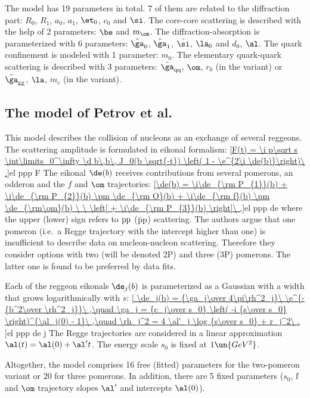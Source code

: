 The model has 19 parameters in total. 7 of them are related to the diffraction part: $R_0$, $R_1$, $a_0$, $a_1$, $\et_0$, $c_0$ and $\si$. The core-core scattering is described with the help of 2 parameters: $\be$ and $m_\om$. The diffraction-absorption is parameterized with 6 parameters: $\hat\ga_0$, $\hat\ga_1$, $\hat\si$, $\la_0$ and $d_0$, $\al$. The quark confinement is modeled with 1 parameter: $m_0$. The elementary quark-quark scattering is described with 3 parameters: $\tilde\ga_{\rm qq}$, $\om$, $r_0$ (in the  variant) or $\tilde\ga_{\rm gg}$, $\la$, $m_c$ (in the  variant).



\subsection{The model of Petrov et al.}

This model  describes the collision of nucleons as an exchange of several reggeons. The scattering amplitude is formulated in eikonal formalism:
\eqref{F(t) = \i p\sqrt s \int\limits_0^\infty \d b\,b\, J_0(b \sqrt{-t}) \left( 1 - \e^{2\i \de(b)}\right)\ .}{el ppp F}
The eikonal $\de(b)$ receives contributions from several pomerons, an odderon and the $f$ and $\om$ trajectories:
\eqref{\de(b) = \i\de_{\rm P_{1}}(b) + \i\de_{\rm P_{2}}(b) \pm \de_{\rm O}(b) + \i\de_{\rm f}(b) \pm \de_{\rm\om}(b) \ \  \left[ + \i\de_{\rm P_{3}}(b) \right]\ ,}{el ppp de}
where the upper (lower) sign refers to $\rm pp$ ($\rm \bar pp$) scattering. The authors argue that one pomeron (i.e.~a Regge trajectory with the intercept higher than one) is insufficient to describe data on nucleon-nucleon scattering. Therefore they consider options with two (will be denoted 2P) and three (3P) pomerons. The latter one is found to be preferred by data fits.

Each of the reggeon eikonals $\de_j(b)$ is parameterized as a Gaussian with a width that grows logarithmically with $s$:
\eqref{
	\de_j(b) = {\ga_j\over 4\pi\rh^2_j}\ \e^{-{b^2\over \rh^2_j}}\ ,\quad
	\ga_j = {c_j\over s_0} \left( -i {s\over s_0} \right)^{\al_j(0) - 1}\ ,\quad
	\rh_j^2 = 4 \al'_j \log {s\over s_0} + r_j^2\ .
}{el ppp de j}
The Regge trajectories are considered in a linear approximation $\al(t) = \al(0) + \al' t$. The energy scale $s_0$ is fixed at $1\un{GeV^2}$.

Altogether, the model comprises 16 free (fitted) parameters for the two-pomeron variant or 20 for three pomerons. In addition, there are 5 fixed parameters ($s_0$, $\rm f$ and $\om$ trajectory slopes $\al'$ and intercepts $\al(0)$).



